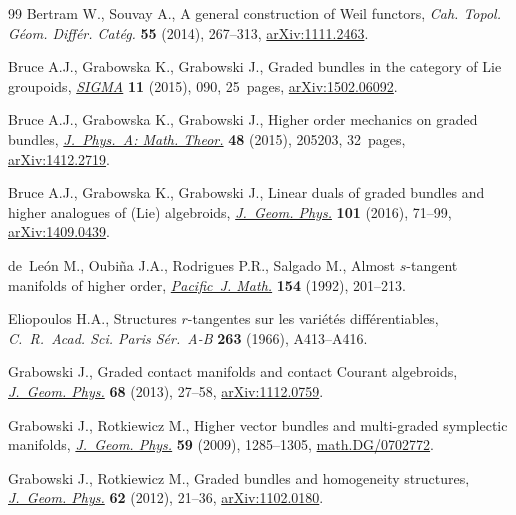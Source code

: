 \documentclass[11pt]{article}
\numberwithin{equation}{section}
\begin{document}
\begin{thebibliography}{99}
Bertram W., Souvay A., A general construction of {W}eil functors, \textit{Cah.
  Topol. G\'eom. Diff\'er. Cat\'eg.} \textbf{55} (2014), 267--313,
  \href{http://arxiv.org/abs/1111.2463}{arXiv:1111.2463}.

Bruce A.J., Grabowska K., Grabowski J., Graded bundles in the category of {L}ie
  groupoids, \href{http://dx.doi.org/10.3842/SIGMA.2015.090}{\textit{SIGMA}} \textbf{11} (2015), 090, 25~pages,
  \href{http://arxiv.org/abs/1502.06092}{arXiv:1502.06092}.

Bruce A.J., Grabowska K., Grabowski J., Higher order mechanics on graded
  bundles, \href{http://dx.doi.org/10.1088/1751-8113/48/20/205203}{\textit{J.~Phys.~A: Math. Theor.}} \textbf{48} (2015), 205203,
  32~pages, \href{http://arxiv.org/abs/1412.2719}{arXiv:1412.2719}.

Bruce A.J., Grabowska K., Grabowski J., Linear duals of graded bundles and
  higher analogues of ({L}ie) algebroids, \href{http://dx.doi.org/10.1016/j.geomphys.2015.12.004}{\textit{J.~Geom. Phys.}} \textbf{101}
  (2016), 71--99, \href{http://arxiv.org/abs/1409.0439}{arXiv:1409.0439}.

de~Le{\'o}n M., Oubi{\~n}a J.A., Rodrigues P.R., Salgado M., Almost
  {$s$}-tangent manifolds of higher order, \href{http://projecteuclid.org/euclid.pjm/1102635616}{\textit{Pacific~J. Math.}}
  \textbf{154} (1992), 201--213.

Eliopoulos H.A., Structures {$r$}-tangentes sur les vari\'et\'es
  dif\/f\'erentiables, \textit{C.~R.~Acad. Sci. Paris S\'er.~A-B} \textbf{263}
  (1966), A413--A416.

Grabowski J., Graded contact manifolds and contact {C}ourant algebroids,
  \href{http://dx.doi.org/10.1016/j.geomphys.2013.02.001}{\textit{J.~Geom. Phys.}} \textbf{68} (2013), 27--58, \href{http://arxiv.org/abs/1112.0759}{arXiv:1112.0759}.

Grabowski J., Rotkiewicz M., Higher vector bundles and multi-graded symplectic
  manifolds, \href{http://dx.doi.org/10.1016/j.geomphys.2009.06.009}{\textit{J.~Geom. Phys.}} \textbf{59} (2009), 1285--1305,
  \href{http://arxiv.org/abs/math.DG/0702772}{math.DG/0702772}.

Grabowski J., Rotkiewicz M., Graded bundles and homogeneity structures,
  \href{http://dx.doi.org/10.1016/j.geomphys.2011.09.004}{\textit{J.~Geom. Phys.}} \textbf{62} (2012), 21--36, \href{http://arxiv.org/abs/1102.0180}{arXiv:1102.0180}.


\end{thebibliography}
\end{document}
